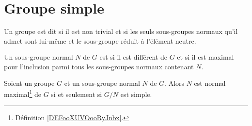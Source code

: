 \section{Groupe simple}


\begin{definition}                 \label{DefGroupeSimple}
	Un groupe est dit  si il est non trivial et si les seuls sous-groupes normaux qu'il admet sont lui-même et le sous-groupe réduit à l'élément neutre.
\end{definition}

\begin{definition}	\label{DEFooXUVOooRyJnbx}
	Un sous-groupe normal \( N\) de \( G\) est  si il est différent de \( G\) et si il est maximal pour l'inclusion parmi tous les sous-groupes normaux contenant \( N\).
\end{definition}


\begin{proposition}	\label{PROPooUWLHooVUxTHB}
	Soient un groupe \( G\) et un sous-groupe normal \( N\) de \( G\). Alors \( N\) est normal maximal\footnote{Définition \ref{DEFooXUVOooRyJnbx}.} de \( G\) si et seulement si \( G/N\) est simple.
\end{proposition}

